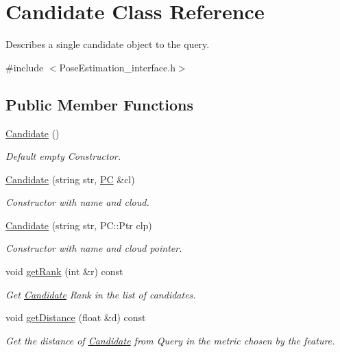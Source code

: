 \hypertarget{classCandidate}{\section{Candidate Class Reference}
\label{classCandidate}
}


Describes a single candidate object to the query.  




{\ttfamily \#include $<$Pose\-Estimation\-\_\-interface.\-h$>$}

\subsection*{Public Member Functions}
\begin{DoxyCompactItemize}
\item 
\hyperlink{classCandidate_aa2747741fb662af5e8f3d01d1d1a43b6}{Candidate} ()
\begin{DoxyCompactList}\small\item\em Default empty Constructor. \end{DoxyCompactList}\item 
\hyperlink{classCandidate_ab11f2b0e931e233a97331802dedcdae1}{Candidate} (string str, \hyperlink{PoseEstimation__interface_8h_a62eb21fcfa3189c5de50fb62a2a7a79e}{P\-C} \&cl)
\begin{DoxyCompactList}\small\item\em Constructor with name and cloud. \end{DoxyCompactList}\item 
\hyperlink{classCandidate_aa875b9c8439139764cf2216bf549abb2}{Candidate} (string str, P\-C\-::\-Ptr clp)
\begin{DoxyCompactList}\small\item\em Constructor with name and cloud pointer. \end{DoxyCompactList}\item 
void \hyperlink{classCandidate_ad66fdb55b874a43a6bd09ac64fb78931}{get\-Rank} (int \&r) const 
\begin{DoxyCompactList}\small\item\em Get \hyperlink{classCandidate}{Candidate} Rank in the list of candidates. \end{DoxyCompactList}\item 
void \hyperlink{classCandidate_a4424e1c6f6d8a739f5a0ea3b8721586f}{get\-Distance} (float \&d) const 
\begin{DoxyCompactList}\small\item\em Get the distance of \hyperlink{classCandidate}{Candidate} from Query in the metric chosen by the feature. \end{DoxyCompactList}\item 

\end{DoxyCompactItemize}
